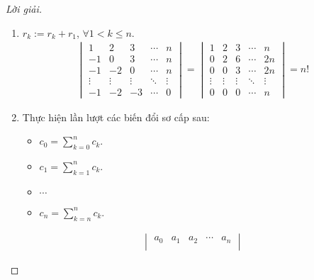 \documentclass[class=linearalgebra,crop=false]{standalone}
\begin{document}
\begin{proof}[Lời giải]
    \begin{enumerate}[label = (\alph*)]
        \item $r_{k} := r_{k} + r_{1}$, $\forall 1 < k\le n$.
              \begin{align*}
                  \begin{vmatrix}
                      1      & 2      & 3      & \cdots & n      \\
                      -1     & 0      & 3      & \cdots & n      \\
                      -1     & -2     & 0      & \cdots & n      \\
                      \vdots & \vdots & \vdots & \ddots & \vdots \\
                      -1     & -2     & -3     & \cdots & 0
                  \end{vmatrix}
                  =
                  \begin{vmatrix}
                      1      & 2      & 3      & \cdots & n      \\
                      0      & 2      & 6      & \cdots & 2n     \\
                      0      & 0      & 3      & \cdots & 2n     \\
                      \vdots & \vdots & \vdots & \ddots & \vdots \\
                      0      & 0      & 0      & \cdots & n
                  \end{vmatrix}
                  = n!
              \end{align*}
        \item Thực hiện lần lượt các biến đổi sơ cấp sau:
              \begin{itemize}
                  \item $c_{0} = \displaystyle\sum^{n}_{k=0}c_{k}$.
                  \item $c_{1} = \displaystyle\sum^{n}_{k=1}c_{k}$.
                  \item $\cdots$
                  \item $c_{n} = \displaystyle\sum^{n}_{k=n}c_{k}$.
              \end{itemize}
              \begingroup
              \allowdisplaybreaks{}
              \begin{align*}
                  \begin{vmatrix}
                      a_{0}  & a_{1}  & a_{2}  & \cdots & a_{n}  \\

\end{vmatrix}
\end{align*}
\end{enumerate}
\end{proof}
\end{document}
